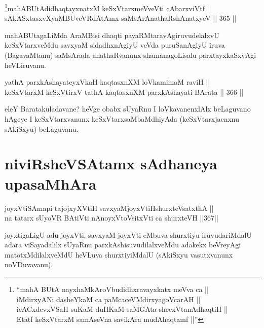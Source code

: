\begin{shl}
\footnote{``mahA BUtA nayxhaMkAroVbudidhxravayxkatx meVva ca ||\\ iMdirxyANi dasheYkaM ca paMcaceVMdirxyagoVcarAH ||\\ icACxdevxVSaH suKaM duHKaM saMGAta shecxVtanAdhaqtiH ||\\ Etatf keSxVtarxM samAseVna savikAra mudAhaqtamf ||''}mahABUtAdidhaqtayxnatxM keSxVtarxmeVveVti cAbarxviVtf || \\
sAkASxtasxvXyaMBUveVRdAtAmx saMsArAnathaRshAnatxyeV \hfill || 365 ||  
\end{shl}

\begin{artha}
mahABUtagaLiMda AraMBisi dhaqti payaRMtaravAgiruvudelalxvU
keSxVtarxveMdu savxyaM sidadhxnAgiyU veVda puruSanAgiyU iruva
(BagavaMtanu) saMsArada anathaRvanunx shamanagoLisalu parxtayxkaSxvAgi
heVLiruvanu.
\end{artha}


\begin{shl}
yathA parxkAshayateyxVkaH kaqtasxnXM loVkamimaM raviH || \\
keSxVtarxM keSxVtirxV tathA kaqtasxnXM parxkAshayati BArata \hfill || 366 ||  
\end{shl}

\begin{artha}
eleY Baratakuladavane? heVge obabx sUyaRnu I loVkavanenxlAlx
beLaguvano hAgeye I keSxVtarxvanunx keSxVtarxsaMbaMdhiyAda
(keSxVtarxjacnxnu sAkiSxyu) beLaguvanu.
\end{artha}

\section*{niviRsheVSAtamx sAdhaneya upasaMhAra}


\begin{shl}
joyxVtiSAmapi tajojxyXVtiH savxyaMjoyxVtiHshurxteVsatxthA || \\
na tatarx sUyoVR BAtiVti nAnoyxV\s toV\s sitxVti ca shurxteVH \hfill ||367||  
\end{shl}

\begin{artha}
joyxtigaLigU adu joyxVti, savxyaM joyxVti eMbuva shurxtiyu
iruvudariMdalU adara viSayadalilx sUyaRnu parxkAshisuvudilalxveMdu
adakekx beVreyAgi matotxMdilalxveMdU heVLuva shurxti\-\break yiMdalU (sAkiSxyu
vasutxvanunx noVDuvavanu).
\end{artha}

